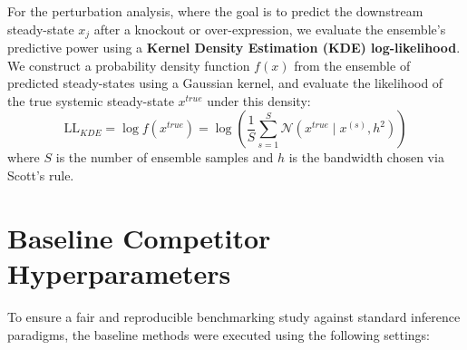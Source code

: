 \documentclass[11pt,onecolumn]{article}
\theoremstyle{definition}
\theoremstyle{remark}
\begin{document}
For the perturbation analysis, where the goal is to predict the downstream steady-state $x_j$ after a knockout or over-expression, we evaluate the ensemble's predictive power using a \textbf{Kernel Density Estimation (KDE) log-likelihood}. We construct a probability density function $f(x)$ from the ensemble of predicted steady-states using a Gaussian kernel, and evaluate the likelihood of the true systemic steady-state $x^{true}$ under this density:
\begin{equation}
    \text{LL}_{KDE} = \log f(x^{true}) = \log \left( \frac{1}{S} \sum_{s=1}^S \mathcal{N}(x^{true} \mid x^{(s)}, h^2) \right)
\end{equation}
where $S$ is the number of ensemble samples and $h$ is the bandwidth chosen via Scott's rule.



\section{Baseline Competitor Hyperparameters}

To ensure a fair and reproducible benchmarking study against standard inference paradigms, the baseline methods were executed using the following settings:
\end{document}
